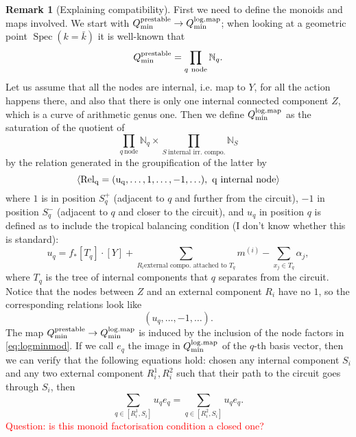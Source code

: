 \documentclass[11pt]{amsart}
\renewcommand{\to}{\rightarrow}
\newcommand{\Spec}{\operatorname{Spec}}
\theoremstyle{definition}
\theoremstyle{definition}
\newtheorem{remark}[thm]{Remark}
\begin{document}
\begin{remark}[Explaining compatibility]
First we need to define the monoids and maps involved. We start with $Q_{\rm{min}}^{\rm{prestable}}\to Q_{\rm{min}}^{\rm{log.map}}$; when looking at a geometric point $\Spec(k=\bar k)$ it is well-known that \[ Q_{\rm{min}}^{\rm{prestable}}=\prod_{q\ \text{node}}\mathbb N_q.\]
Let us assume that all the nodes are internal, i.e. map to $Y$, for all the action happens there, and also that there is only one internal connected component $Z$, which is a curve of arithmetic genus one. Then we define $Q_{\rm{min}}^{\rm{log.map}}$ as the saturation of the quotient of
\begin{equation}\label{eq:logminmod} \prod_{q\ \text{node}}\mathbb N_q \times \prod_{S\ \text{internal irr. compo.}}\mathbb N_S\end{equation}
by the relation generated in the groupification of the latter by
\[\langle \rm{Rel}_q=(u_q,\ldots,1,\ldots,-1,\ldots),\ q\ \text{internal node} \rangle\]
where $1$ is in position $S_q^+$ (adjacent to $q$ and further from the circuit), $-1$ in position $S_q^-$ (adjacent to $q$ and closer to the circuit), and $u_q$ in position $q$ is defined as to include the tropical balancing condition (I don't know whether this is standard):
\[u_q=f_*[T_q]\cdot [Y]+\sum_{R_i \text{external compo. attached to }T_q} m^{(i)}- \sum_{x_j\in T_q}\alpha_j,\]
where $T_q$ is the tree of internal components that $q$ separates from the circuit. Notice that the nodes between $Z$ and an external component $R_i$ have no $1$, so the corresponding relations look like \[(u_q,\ldots,-1,\ldots).\]
The map $Q_{\rm{min}}^{\rm{prestable}}\to Q_{\rm{min}}^{\rm{log.map}}$ is induced by the inclusion of the node factors in \eqref{eq:logminmod}. If we call $e_q$ the image in $Q_{\rm{min}}^{\rm{log.map}}$ of the $q$-th basis vector, then we can verify that the following equations hold: chosen any internal component $S_i$ and any two external component $R_i^1, R_i^2$
such that their path to the circuit goes through $S_i$, then
\begin{equation}
 \sum_{q\in[R_i^1,S_i]}u_qe_q=\sum_{q\in[R_i^2,S_i]}u_qe_q.
\end{equation}
\textcolor{red}{Question: is this monoid factorisation condition a closed one?}
\end{remark}
\end{document}
